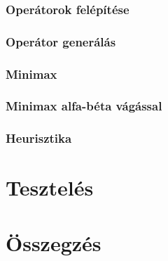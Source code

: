 \documentclass[
]{thesis-ekf}
\theoremstyle{definition}
\theoremstyle{remark}
\begin{document}
\subsection{Operátorok felépítése}

\subsection{Operátor generálás}

\subsection{Minimax}

\subsection{Minimax alfa-béta vágással}

\subsection{Heurisztika}




\chapter{Tesztelés}

\chapter*{Összegzés}
\end{document}

